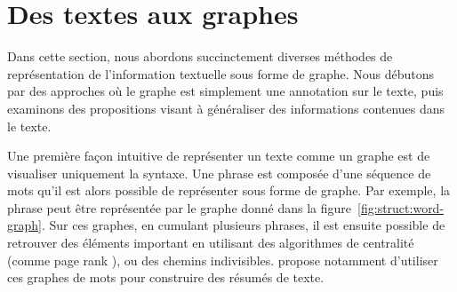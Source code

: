 \section{Des textes aux graphes}
\label{sec:struct:related-works}

Dans cette section, nous abordons succinctement diverses méthodes de représentation de l'information textuelle sous forme de graphe.
Nous débutons par des approches où le graphe est simplement une annotation sur le texte, puis examinons des propositions visant à généraliser des informations contenues dans le texte.

Une première façon intuitive de représenter un texte comme un graphe est de visualiser uniquement la syntaxe.
Une phrase est composée d'une séquence de mots qu'il est alors possible de représenter sous forme de graphe.
Par exemple, la phrase  peut être représentée par le graphe donné dans la figure~\ref{fig:struct:word-graph}.
Sur ces graphes, en cumulant plusieurs phrases, il est ensuite possible de retrouver des éléments important en utilisant des algorithmes de centralité (comme page rank \cite{pagePageRankCitationRanking1999}), ou des chemins indivisibles.
\cite{ganesanOpinosisGraphBased2010} propose notamment d'utiliser ces graphes de mots pour construire des résumés de texte.


